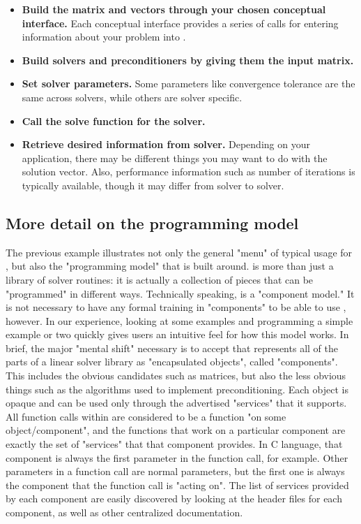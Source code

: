 \begin{enumerate}
\begin{itemize}
\item
{\bf Build the matrix and vectors through your chosen conceptual interface.} Each
conceptual interface 
provides a series of calls for entering information about your problem into
\hypre{}.

\item
{\bf Build solvers and preconditioners by giving them the input matrix.}

\item
{\bf Set solver parameters.} Some parameters like convergence tolerance are the
same across solvers, 
while others are solver specific.

\item
{\bf Call the solve function for the solver.}

\item
{\bf Retrieve desired information from solver.} Depending on your application,
there may be different 
things you may want to do with the solution vector. Also, performance
information such as number of 
iterations is typically available, though it may differ from solver to solver.

\end{itemize}


\subsection{More detail on the programming model}

The previous example illustrates not only the general "menu" of typical usage
for \hypre{}, but also the 
"programming model" that \hypre{} is built around. \hypre{} is more than just a
library of solver routines: it 
is actually a collection of pieces that can be "programmed" in different ways.
Technically speaking, 
\hypre{} is a "component model." It is not necessary to have any formal training
in "components" to be able 
to use \hypre{}, however. In our experience, looking at some examples and
programming a simple example 
or two quickly gives users an intuitive feel for how this model works. In
brief, the major "mental shift" 
necessary is to accept that \hypre{} represents all of the parts of a linear
solver library as "encapsulated 
objects", called "components". This includes the obvious candidates such as
matrices, but also the less 
obvious things such as the algorithms used to implement preconditioning. Each
object is opaque and can be 
used only through the advertised "services" that it supports. All function
calls within \hypre{} are 
considered to be a function "on some object/component", and the functions that
work on a particular 
component are exactly the set of "services" that that component provides. In C
language, that component is 
always the first parameter in the function call, for example. Other parameters
in a function call are normal 
parameters, but the first one is always the component that the function call is
"acting on". The list of 
services provided by each component are easily discovered by looking at the
header files for each 
component, as well as other centralized documentation. 


\end{enumerate}
